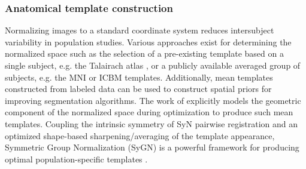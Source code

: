 \subsubsection{Anatomical template construction}

Normalizing images to a standard coordinate system
reduces intersubject variability in population studies.  Various
approaches exist for determining the normalized space such as the selection
of a pre-existing template based on a single subject, e.g. the Talairach
atlas \citep{Talairach1988}, or a publicly available averaged group of
subjects, e.g. the MNI \citep{Collins1994} or ICBM \citep{Mazziotta1995}
templates.  Additionally, mean templates constructed from labeled
data can be used to construct spatial priors for improving segmentation
algorithms.
The work of \cite{avants2010} explicitly models the geometric component of the 
normalized space during optimization to produce such mean templates.  Coupling the intrinsic symmetry of 
SyN pairwise registration \citep{avants2011} and an
optimized shape-based sharpening/averaging of the template appearance, Symmetric Group
Normalization (SyGN) is a powerful framework for producing optimal population-specific
templates \citep{avants2010}.




